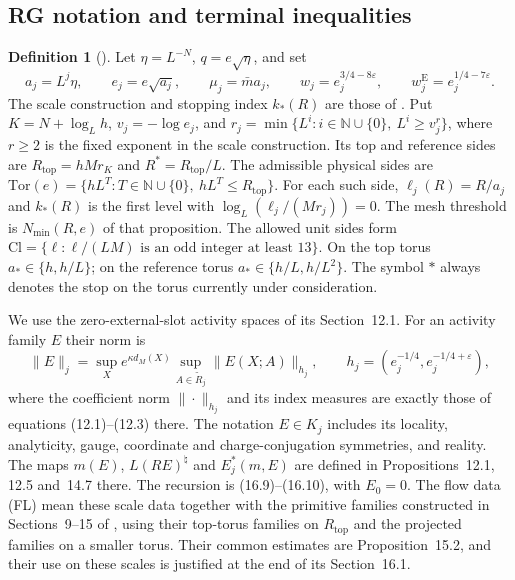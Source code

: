 \documentclass[11pt,letterpaper,reqno]{amsart}
\theoremstyle{definition}
\newtheorem{qcmdefinition}[qcmproposition]{Definition}
\newenvironment{definition}[1][]{\pushQED{\qed}\renewcommand{\qedsymbol}{$\blacksquare$}\begin{qcmdefinition}[#1]}{\popQED\end{qcmdefinition}}
\begin{document}
\subsection{RG notation and terminal inequalities}

\begin{definition}\label{qcm:rg-notation}
Let $\eta=L^{-N}$, $q=e\sqrt\eta$, and set
\[
 a_j=L^j\eta,\qquad e_j=e\sqrt{a_j},\qquad
 \mu_j=\bar m a_j,\qquad
 w_j=e_j^{3/4-8\varepsilon},\qquad
 w_j^{\mathrm E}=e_j^{1/4-7\varepsilon}.
\]
The scale construction and stopping index $k_*(R)$ are those of
\cite[Proposition~16.1]{QEDConstruction}.
Put $K=N+\log_Lh$, $v_j=-\log e_j$, and
$r_j=\min\{L^i:i\in\mathbb N\cup\{0\},\ L^i\ge v_j^r\}$,
where $r\ge2$ is the fixed exponent in the scale construction.
Its top and reference sides are
$R_{\mathrm{top}}=hMr_K$ and $R^*=R_{\mathrm{top}}/L$.
The admissible physical sides are
$\mathrm{Tor}(e)=\{hL^T:T\in\mathbb N\cup\{0\},\ hL^T\le R_{\mathrm{top}}\}$.
For each such side, $\ell_j(R)=R/a_j$ and $k_*(R)$ is the
first level with $\log_L(\ell_j/(Mr_j))=0$.
The mesh threshold is $N_{\min}(R,e)$ of that proposition.
The allowed unit sides form
$\mathrm{Cl}=\{\ell:\ell/(LM)\text{ is an odd integer at least }13\}$.
On the top torus $a_*\in\{h,h/L\}$; on the reference torus
$a_*\in\{h/L,h/L^2\}$. The symbol $*$ always denotes the stop
on the torus currently under consideration.

We use the zero-external-slot activity spaces of its Section~12.1.
For an activity family $E$ their norm is
\[
 \|E\|_j=\sup_X e^{\kappa d_M(X)}
          \sup_{A\in\widetilde R_j}\|E(X;A)\|_{h_j},
 \qquad h_j=(e_j^{-1/4},e_j^{-1/4+\varepsilon}),
\]
where the coefficient norm $\|\cdot\|_{h_j}$ and its index
measures are exactly those of equations (12.1)--(12.3) there.
The notation $E\in K_j$ includes its locality, analyticity,
gauge, coordinate and charge-conjugation symmetries, and reality.
The maps $m(E)$, $L(RE)^\natural$ and $E_j^*(m,E)$ are defined in
Propositions~12.1, 12.5 and~14.7 there. The recursion is (16.9)--(16.10),
with $E_0=0$.
The flow data (FL) mean these scale data together with the
primitive families constructed in Sections~9--15 of
\cite{QEDConstruction}, using their top-torus families on
$R_{\mathrm{top}}$ and the projected families on a smaller
torus. Their common estimates are Proposition~15.2, and their
use on these scales is justified at the end of its Section~16.1.
\end{definition}
\end{document}
